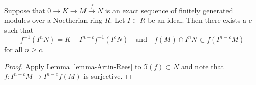 \begin{lemma}
\label{lemma-map-AR}
Suppose that $0 \to K \to M \xrightarrow{f} N$ is an
exact sequence of finitely generated modules
over a Noetherian ring $R$. Let $I \subset R$ be an ideal.
Then there exists a $c$ such that
$$
f^{-1}(I^nN) = K + I^{n-c}f^{-1}(I^cN)
\quad\text{and}\quad
f(M) \cap I^nN \subset f(I^{n - c}M)
$$
for all $n \geq c$.
\end{lemma}

\begin{proof}
Apply Lemma \ref{lemma-Artin-Rees} to
$\Im(f) \subset N$ and note that
$f : I^{n-c}M \to I^{n-c}f(M)$ is surjective.
\end{proof}